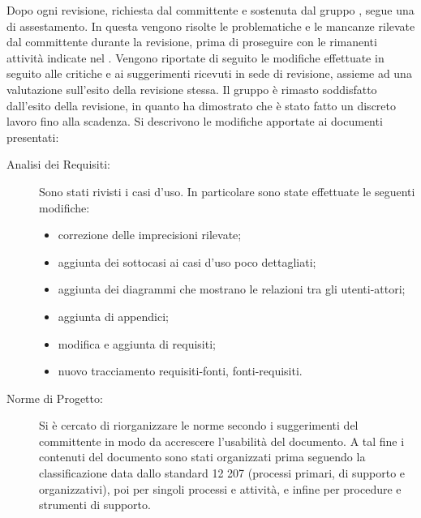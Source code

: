 	Dopo ogni revisione, richiesta dal committente e sostenuta dal gruppo \groupname{}, segue una  di assestamento. In questa  vengono risolte le problematiche e le mancanze rilevate dal committente durante la revisione, prima di proseguire con le rimanenti attività indicate nel .
	Vengono riportate di seguito le modifiche effettuate in seguito alle critiche e ai suggerimenti ricevuti in sede di revisione, assieme ad una valutazione sull'esito della revisione stessa.
		Il gruppo è rimasto soddisfatto dall'esito della revisione, in quanto ha dimostrato che è stato fatto un discreto lavoro fino alla scadenza.
		Si descrivono le modifiche apportate ai documenti presentati:
		\begin{description}
			\item[Analisi dei Requisiti:] Sono stati rivisti i casi d'uso. In particolare sono state effettuate le seguenti modifiche:
			\begin{itemize}
				\item correzione delle imprecisioni rilevate;
				\item aggiunta dei sottocasi ai casi d'uso poco dettagliati;
				\item aggiunta dei diagrammi che mostrano le relazioni tra gli utenti-attori;
				\item aggiunta di appendici;
				\item modifica e aggiunta di requisiti;
				\item nuovo tracciamento requisiti-fonti, fonti-requisiti.
			\end{itemize}
			\item[Norme di Progetto:] Si è cercato di riorganizzare le norme secondo i suggerimenti del committente in modo da accrescere l'usabilità del documento. A tal fine i contenuti del documento sono stati organizzati prima seguendo la classificazione data dallo standard 12 207 (processi primari, di supporto e organizzativi), poi per singoli processi e attività, e infine per procedure e strumenti di supporto.

\end{description}
